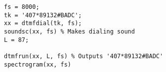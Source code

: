 \begin{lstlisting}[Language=Matlab]
fs = 8000;
tk = '407*89132#BADC';
xx = dtmfdial(tk, fs);
soundsc(xx, fs) % Makes dialing sound
L = 87;

dtmfrun(xx, L, fs) % Outputs '407*89132#BADC'
spectrogram(xx, fs)
\end{lstlisting}